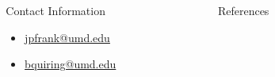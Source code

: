 \documentclass[final]{beamer}
\newlength{\sepmargin}
\newlength{\sepwid}
\newlength{\onecolwid}
\begin{document}
\begin{frame}[t]
  \begin{columns}[t] %
    
    \begin{column}{\sepmargin} \end{column}
    \begin{column}{\onecolwid} %
      
      \vspace*{-0.9cm}
      \begin{alertblock}{\large Contact Information}
        \vspace*{-0.5cm}
	\begin{footnotesize}
	  \begin{itemize}
	  \item \href{mailto:jpfrank@umd.edu}{jpfrank@umd.edu}
	  \item \href{mailto:bquiring@umd.edu}{bquiring@umd.edu}
	  \end{itemize}
	\end{footnotesize}	
	
      \end{alertblock}
    \end{column} %
    \begin{column}{\sepwid}\end{column} %
    \begin{column}{\onecolwid} %
      \begin{block}{\large References}
	\vspace*{-0.5cm}
        \nocite{*} %
	       {\footnotesize
		 }
      \end{block} 
    \end{column} %
    
    \begin{column}{\sepmargin}\end{column} %
    
  \end{columns} %


\end{frame} %
\end{document}
